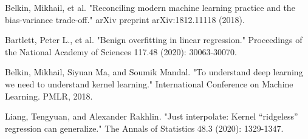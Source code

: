 \documentclass[12pt]{amsart}
\begin{document}
\begin{thebibliography}{20}

Belkin, Mikhail, et al. "Reconciling modern machine learning practice and the bias-variance trade-off." arXiv preprint arXiv:1812.11118 (2018).

Bartlett, Peter L., et al. "Benign overfitting in linear regression." Proceedings of the National Academy of Sciences 117.48 (2020): 30063-30070.

Belkin, Mikhail, Siyuan Ma, and Soumik Mandal. "To understand deep learning we need to understand kernel learning." International Conference on Machine Learning. PMLR, 2018.

Liang, Tengyuan, and Alexander Rakhlin. "Just interpolate: Kernel “ridgeless” regression can generalize." The Annals of Statistics 48.3 (2020): 1329-1347.

\end{thebibliography}
\end{document}
